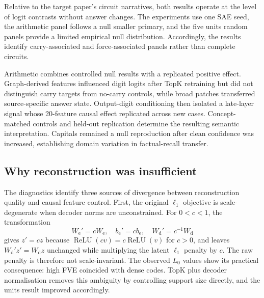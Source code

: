 \documentclass[11pt,a4paper]{article}
\begin{document}
    Relative to the target paper's circuit narratives, both results operate at the level of logit contrasts without answer changes. The experiments use one SAE seed, the arithmetic panel follows a null smaller primary, and the five units random panels provide a limited empirical null distribution. Accordingly, the results identify carry-associated and force-associated panels rather than complete circuits.

    Arithmetic combines controlled null results with a replicated positive effect. Graph-derived features influenced digit logits after TopK retraining but did not distinguish carry targets from no-carry controls, while broad patches transferred source-specific answer state. Output-digit conditioning then isolated a late-layer signal whose 20-feature causal effect replicated across new cases. Concept-matched controls and held-out replication determine the resulting semantic interpretation. Capitals remained a null reproduction after clean confidence was increased, establishing domain variation in factual-recall transfer.

\subsection{Why reconstruction was insufficient}

    The diagnostics identify three sources of divergence between reconstruction quality and causal feature control. First, the original $\ell_1$ objective is scale-degenerate when decoder norms are unconstrained. For $0<c<1$, the transformation
    \begin{equation}
        W_{\mathrm e}'=cW_{\mathrm e},\quad     b_{\mathrm e}'=cb_{\mathrm e},\quad     W_{\mathrm d}'=c^{-1}W_{\mathrm d}
    \end{equation} gives $z'=cz$ because $\operatorname{ReLU}(cv)=c\operatorname{ReLU}(v)$ for $c>0$, and leaves $W_{\mathrm d}'z'=W_{\mathrm d}z$ unchanged while multiplying the latent $\ell_1$ penalty by $c$. The raw penalty is therefore not scale-invariant. The observed $L_0$ values show its practical consequence: high FVE coincided with dense codes. TopK plus decoder normalisation removes this ambiguity by controlling support size directly, and the units result improved accordingly.
\end{document}
